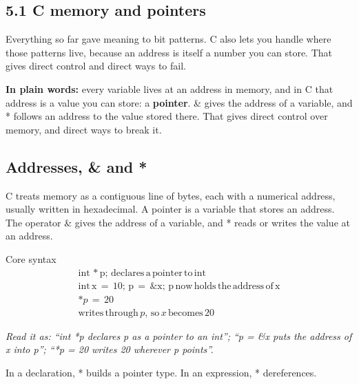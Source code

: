 \documentclass[11pt]{article}
\begin{document}
\begin{keepsection}
\section{5.1 C memory and pointers}

Everything so far gave meaning to bit patterns. C also lets you handle where those patterns live, because an address is itself a number you can store. That gives direct control and direct ways to fail.

\begin{plainbox}\textbf{In plain words:} every variable lives at an address in memory, and in C that address is a value you can store: a \textbf{pointer}. \& gives the address of a variable, and * follows an address to the value stored there. That gives direct control over memory, and direct ways to break it.\end{plainbox}

\begin{keepsection}
\subsection{Addresses, \& and *}

C treats memory as a contiguous line of bytes, each with a numerical address, usually written in hexadecimal. A pointer is a variable that stores an address. The operator \& gives the address of a variable, and * reads or writes the value at an address.

\begin{equationcard}{Core syntax}
\[ \begin{gathered} \text{int}\, *\mathrm{p};\, \text{declares}\, \mathrm{a}\, \text{pointer}\, \text{to}\, \text{int} \\ \text{int}\, \mathrm{x}\, =\, 10;\, \mathrm{p}\, =\, \&\mathrm{x};\, \mathrm{p}\, \text{now}\, \text{holds}\, \text{the}\, \text{address}\, \text{of}\, \mathrm{x} \\ *{p}\, =\, 20 \\ \text{writes}\, \text{through}\, {p},\, \text{so}\, {x}\, \text{becomes}\, 20 \end{gathered} \]
{\small \emph{Read it as: “int *p declares p as a pointer to an int”; “p = \&x puts the address of x into p”; “*p = 20 writes 20 wherever p points”.}\par In a declaration, * builds a pointer type. In an expression, * dereferences.}
\end{equationcard}


\end{keepsection}
\end{keepsection}
\end{document}
